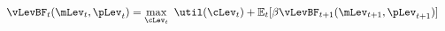   \begin{equation}\begin{gathered}\begin{aligned}
    \vLevBF_{t}(\mLev_{t},\pLev_{t})  & = \max_{\cLev_{t}}~ \util(\cLev_{t}) + \Ex_{t}[{\DiscAlt} \vLevBF_{t+1}({\mLev}_{t+1},\pLev_{t+1})]\label{eq:vrecurse}
  \end{aligned}\end{gathered}\end{equation}
